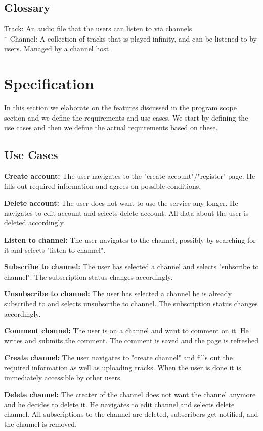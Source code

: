 \documentclass[a4paper,11pt,report]{article}
\begin{document}
\subsection{Glossary}
Track: An audio file that the users can listen to via channels. \\*
Channel: A collection of tracks that is played infinity, and can be listened to by users. Managed by a channel host.

\section{Specification}
In this section we elaborate on the features discussed in the program scope section and we define the requirements and use cases. We start by defining the use cases and then we define the actual requirements based on these. 
\subsection{Use Cases}
\textbf{Create account:}
The user navigates to the "create account"/"register" page. He fills out required information and agrees on possible conditions.

\textbf{Delete account:}
The user does not want to use the service any longer. He navigates to edit account and selects delete account. All data about the user is deleted accordingly.

\textbf{Listen to channel:}
The user navigates to the channel, possibly by searching for it and selects "listen to channel".

\textbf{Subscribe to channel:}
The user has selected a channel and selects "subscribe to channel". The subscription status changes accordingly.

\textbf{Unsubscribe to channel:}
The user has selected a channel he is already subscribed to and selects unsubscribe to channel. The subscription status changes accordingly.

\textbf{Comment channel:}
The user is on a channel and want to comment on it. He writes and submits the comment. The comment is saved and the page is refreshed

\textbf{Create channel:}
The user navigates to "create channel" and fills out the required information as well as uploading tracks. When the user is done it is immediately accessible by other users.

\textbf{Delete channel:}
The creater of the channel does not want the channel anymore and he decides to delete it. He navigates to edit channel and selects delete channel. All subscriptions to the channel are deleted, subscribers get notified, and the channel is removed.
\end{document}
